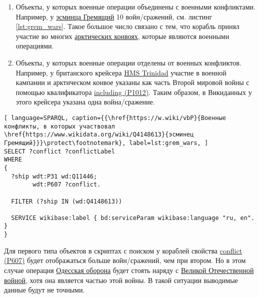 \begin{enumerate}
  \item Объекты, у которых военные операции объединены с военными конфликтами. Например, у \href{https://www.wikidata.org/wiki/Q4148613}{эсминца Гремящий} 10 войн/сражений, см. листинг \ref{lst:grem_wars}. Такое большое число связано с тем, что корабль принял участие во многих \href{https://ru.wikipedia.org/wiki/Арктические_конвои}{арктических конвоях}, которые являются военными операциями.
  \item Объекты, у которых военные операции отделены от военных конфликтов. Например, у британского крейсера \href{https://ru.wikipedia.org/wiki/HMS_Trinidad_(1940)}{HMS Trinidad} участие в военной кампании и арктическом конвое указаны как часть Второй мировой войны с помощью квалификатора \href{https://www.wikidata.org/wiki/Property:P1012}{including (P1012)}. Таким образом, в Викиданных у этого крейсера указана одна война/сражение.
\end{enumerate}


\label{question:ship_3}


\begin{lstlisting}[ language=SPARQL, caption={{\href{https://w.wiki/vbP}{Военные конфликты, в которых участвовал \href{https://www.wikidata.org/wiki/Q4148613}{эсминец Гремящий}}}\protect\footnotemark}, label=lst:grem_wars, ]
SELECT ?conflict ?conflictLabel
WHERE
{
  ?ship wdt:P31 wd:Q11446;
        wdt:P607 ?conflict.
    
  FILTER (?ship IN (wd:Q4148613))
              
  SERVICE wikibase:label { bd:serviceParam wikibase:language "ru, en". }
}
\end{lstlisting}

Для первого типа объектов в скриптах с поиском у кораблей свойства \href{https://www.wikidata.org/wiki/Property:P607}{conflict (P607)} будет отображаться больше войн/сражений, чем при втором. Но в этом случае операция \href{https://ru.wikipedia.org/wiki/Одесская_оборона_(1941)}{Одесская оборона} будет стоять наряду с \href{https://ru.wikipedia.org/wiki/Великая_Отечественная_война}{Великой Отечественной войной}, хотя она является частью этой войны. В такой ситуации выводимые данные будут не точными.

